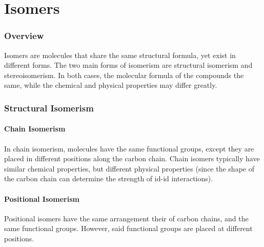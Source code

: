 

\pagebreak
\part{Isomers}

	\section{Overview}

	Isomers are molecules that share the same structural formula, yet exist in different forms. The two main
	forms of isomerism are structural isomerism and stereoisomerism. In both cases, the molecular formula of the
	compounds the same, while the chemical and physical properties may differ greatly.


	\section{Structural Isomerism}

		\subsection{Chain Isomerism}

			In chain isomerism, molecules have the same functional groups, except they are placed in different positions
			along the carbon chain. Chain isomers typically have similar chemical properties, but different physical
			properties (since the shape of the carbon chain can determine the strength of id-id interactions).





		\subsection{Positional Isomerism}
			Positional isomers have the same arrangement their of carbon chains, and the same functional groups. However, said
			functional groups are placed at different positions.



